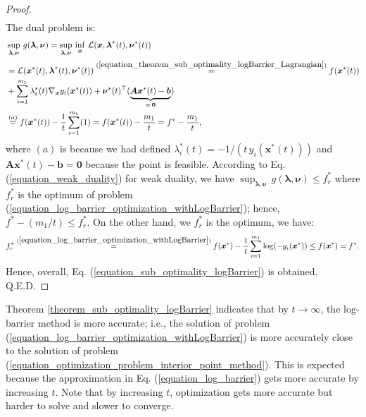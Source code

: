 \documentclass[lang=cn,10pt]{gorgeousnbook}
\numberwithin{equation}{section}%
\numberwithin{figure}{section}%
\begin{document}
\begin{proof}
\begin{align*}
\end{align*}
The dual problem is:
\begin{align*}
&\sup_{\boldsymbol{\lambda}, \boldsymbol{\nu}}\, g(\boldsymbol{\lambda}, \boldsymbol{\nu}) = \sup_{\boldsymbol{\lambda}, \boldsymbol{\nu}}\, \inf_{\boldsymbol{x}}\, \mathcal{L}(\boldsymbol{x},\boldsymbol{\lambda}^*(t), \boldsymbol{\nu}^*(t)) \\
&= \mathcal{L}(\boldsymbol{x}^*(t),\boldsymbol{\lambda}^*(t), \boldsymbol{\nu}^*(t)) \overset{(\ref{equation_theorem_sub_optimality_logBarrier_Lagrangian})}{=} f(\boldsymbol{x}^*(t)) \\
&+ \sum_{i=1}^{m_1} \lambda_i^*(t) \nabla_{\boldsymbol{x}} y_i(\boldsymbol{x}^*(t)) + \boldsymbol{\nu}^*(t)^\top (\underbrace{\boldsymbol{A} \boldsymbol{x}^*(t) - \boldsymbol{b}}_{=\,\boldsymbol{0}}) \\
&\overset{(a)}{=} f(\boldsymbol{x}^*(t)) -\frac{1}{t} \sum_{i=1}^{m_1} (1) = f(\boldsymbol{x}^*(t)) - \frac{m_1}{t} = f^* - \frac{m_1}{t},
\end{align*}
where $(a)$ is because we had defined $\lambda_i^*(t) = -1 / (t\, y_i(\boldsymbol{x}^*(t)))$ and $\boldsymbol{A} \boldsymbol{x}^*(t) - \boldsymbol{b} = \boldsymbol{0}$ because the point is feasible. 
According to Eq. (\ref{equation_weak_duality}) for weak duality, we have $\sup_{\boldsymbol{\lambda}, \boldsymbol{\nu}}\, g(\boldsymbol{\lambda}, \boldsymbol{\nu}) \leq f_r^*$ where $f_r^*$ is the optimum of problem (\ref{equation_log_barrier_optimization_withLogBarrier}); hence, $f^* - (m_1/t) \leq f_r^*$. On the other hand, we $f_r^*$ is the optimum, we have:
\begin{align*}
f_r^* \overset{(\ref{equation_log_barrier_optimization_withLogBarrier})}{=} f(\boldsymbol{x}^*) - \frac{1}{t} \sum_{i=1}^{m_1} \log(-y_i(\boldsymbol{x}^*)) \leq f(\boldsymbol{x}^*) = f^*.
\end{align*}
Hence, overall, Eq. (\ref{equation_sub_optimality_logBarrier}) is obtained. Q.E.D.
\end{proof}

Theorem \ref{theorem_sub_optimality_logBarrier} indicates that by $t \rightarrow \infty$, the log-barrier method is more accurate; i.e., the solution of problem (\ref{equation_log_barrier_optimization_withLogBarrier}) is more accurately close to the solution of problem (\ref{equation_optimization_problem_interior_point_method}). 
This is expected because the approximation in Eq. (\ref{equation_log_barrier}) gets more accurate by increasing $t$. 
Note that by increasing $t$, optimization gets more accurate but harder to solve and slower to converge. 
\end{document}
